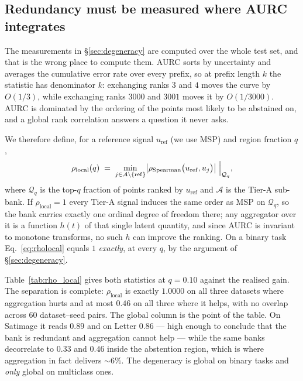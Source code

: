 \documentclass[conference]{IEEEtran}
\begin{document}



\subsection{Redundancy must be measured where AURC integrates}
\label{sec:mechanism}

The measurements in \S\ref{sec:degeneracy} are computed over the whole
test set, and that is the wrong place to compute them. AURC sorts by
uncertainty and averages the cumulative error rate over every prefix, so
at prefix length $k$ the statistic has denominator $k$: exchanging ranks
$3$ and $4$ moves the curve by $O(1/3)$, while exchanging ranks $3000$
and $3001$ moves it by $O(1/3000)$. AURC is dominated by the ordering of
the points most likely to be abstained on, and a global rank correlation
answers a question it never asks.

We therefore define, for a reference signal $u_{\mathrm{ref}}$ (we use
MSP) and region fraction $q$,
\begin{equation}
  \rho_{\mathrm{local}}(q) \;=\;
  \min_{j \in \mathcal{A} \setminus \{\mathrm{ref}\}}
  \bigl| \rho_{\mathrm{Spearman}}\bigl(u_{\mathrm{ref}}, u_j\bigr) \bigr|
  \Bigm|_{\mathcal{Q}_q},
  \label{eq:rholocal}
\end{equation}
where $\mathcal{Q}_q$ is the top-$q$ fraction of points ranked by
$u_{\mathrm{ref}}$ and $\mathcal{A}$ is the Tier-A sub-bank. If
$\rho_{\mathrm{local}} = 1$ every Tier-A signal induces the same order as
MSP on $\mathcal{Q}_q$, so the bank carries exactly one ordinal degree of
freedom there; any aggregator over it is a function $h(t)$ of that single
latent quantity, and since AURC is invariant to monotone transforms, no
such $h$ can improve the ranking. On a binary task
Eq.~\ref{eq:rholocal} equals $1$ \emph{exactly}, at every $q$, by the
argument of \S\ref{sec:degeneracy}.

Table~\ref{tab:rho_local} gives both statistics at $q = 0.10$ against the
realised gain. The separation is complete: $\rho_{\mathrm{local}}$ is
exactly $1.0000$ on all three datasets where aggregation hurts and at
most $0.46$ on all three where it helps, with no overlap across $60$
dataset--seed pairs. The global column is the point of the table. On
Satimage it reads $0.89$ and on Letter $0.86$ --- high enough to
conclude that the bank is redundant and aggregation cannot help --- while
the same banks decorrelate to $0.33$ and $0.46$ inside the abstention
region, which is where aggregation in fact delivers ${\sim}6\%$. The
degeneracy is global on binary tasks and \emph{only} global on multiclass
ones.
\end{document}
